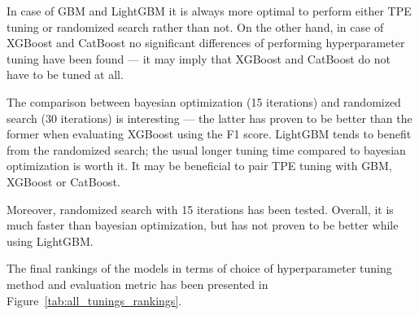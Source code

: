 \documentclass[magisterska, english]{pwr_wmat_praca_dyplomowa}
\theoremstyle{plain}
\numberwithin{theorem}{chapter}
\theoremstyle{definition}
\numberwithin{theorem}{chapter}
\begin{document}
In case of GBM and LightGBM it is always more optimal to perform either TPE tuning or randomized search rather than not. On the other hand, in case of XGBoost and CatBoost no significant differences of performing hyperparameter tuning have been found --- it may imply that XGBoost and CatBoost do not have to be tuned at all.

The comparison between bayesian optimization (15 iterations) and randomized search (30 iterations) is interesting --- the latter has proven to be better than the former when evaluating XGBoost using the F1 score. LightGBM tends to benefit from the randomized search; the usual longer tuning time compared to bayesian optimization is worth it. It may be beneficial to pair TPE tuning with GBM, XGBoost or CatBoost.

Moreover, randomized search with 15 iterations has been tested. Overall, it is much faster than bayesian optimization, but has not proven to be better while using LightGBM.

The final rankings of the models in terms of choice of hyperparameter tuning method and evaluation metric has been presented in Figure~\ref{tab:all_tunings_rankings}. 

\end{document}
